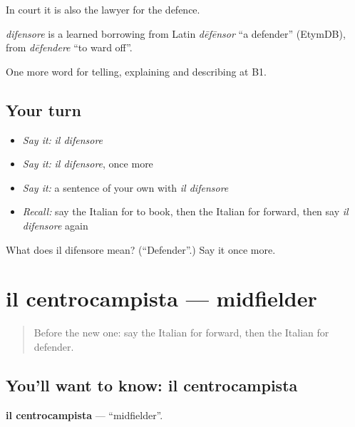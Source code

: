 In court it is also the lawyer for the defence.

\begin{cousinweb}
\emph{difensore} is a learned borrowing from Latin \emph{dēfēnsor} \textquotedblleft{}a defender\textquotedblright{} (EtymDB), from \emph{dēfendere} \textquotedblleft{}to ward off\textquotedblright{}.
\end{cousinweb}

\begin{grammarlens}[title={What you've built}]
One more word for telling, explaining and describing at B1.
\end{grammarlens}

\subsection*{Your turn}
\begin{itemize}
\raggedright
  \item \emph{Say it:} \emph{il difensore}
  \item \emph{Say it:} \emph{il difensore}, once more
  \item \emph{Say it:} a sentence of your own with \emph{il difensore}
  \item \emph{Recall:} say the Italian for to book, then the Italian for forward, then say \emph{il difensore} again
\end{itemize}

\begin{tcolorbox}[breakable,colback=teal!4,colframe=teal!35!black,title={Before you move on}]
What does il difensore mean? (\textquotedblleft{}Defender\textquotedblright{}.) Say it once more.
\end{tcolorbox}
\section[il centrocampista]{il centrocampista — midfielder}

\label{lesson:IT-C510-centrocampista}



\begin{quote}
Before the new one: say the Italian for forward, then the Italian for defender.
\end{quote}

\subsection*{You'll want to know: il centrocampista}
\textbf{il centrocampista} — \textquotedblleft{}midfielder\textquotedblright{}.

